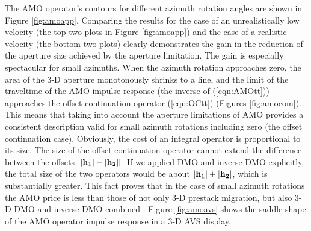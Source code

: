 \par
The AMO operator's contours for
different azimuth rotation angles are shown in  
Figure \ref{fig:amoapp}. 
Comparing the results for the case of an unrealistically low velocity
(the top two plots in Figure \ref{fig:amoapp}) and the case of a realistic
velocity (the bottom two plots) clearly demonstrates  
the gain in the reduction of the aperture size 
achieved by the aperture limitation.
The gain is
especially spectacular for small azimuths. When the azimuth rotation
approaches zero, the area of the 3-D aperture monotonously shrinks to a
line, and the limit of the traveltime of the AMO impulse response
(the inverse of (\ref{eqn:AMOtt})) approaches the offset continuation operator
(\ref{eqn:OCtt}) (Figures \ref{fig:amocom}). This means that
taking into account 
the aperture limitations of AMO provides a consistent description
valid for small azimuth rotations including zero (the offset 
continuation case). Obviously, the cost of an integral operator is
proportional to its size. The size of the offset continuation
operator cannot extend the difference between the offsets ${\bf
\left|\left|h_1\right|-\left|h_2\right|\right|}$. If we applied DMO and
inverse DMO explicitly, the total size of the two operators would be
about ${\bf\left|h_1\right|+\left|h_2\right|}$, which is
substantially greater. This fact proves that in the case of small
azimuth rotations the AMO price is less than those of not only 3-D prestack
migration, but also 3-D DMO and inverse DMO combined \cite{anat}.
Figure \ref{fig:amoavs} shows the saddle shape of the AMO operator impulse
response in a 3-D AVS display. 



